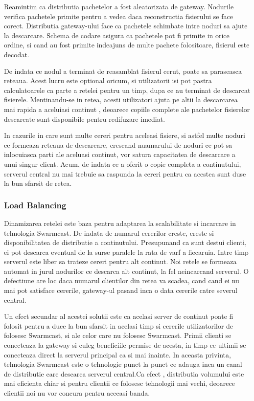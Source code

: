 Reamintim ca distributia pachetelor a fost aleatorizata de gateway. Nodurile
verifica pachetele primite pentru a vedea daca reconstructia fisierului se
face corect. Distributia gateway-ului face ca pachetele schimbate intre noduri
sa ajute la descarcare. Schema de codare asigura ca pachetele pot fi primite
in orice ordine, si cand au fost primite indeajuns de multe pachete
folositoare, fisierul este decodat.

De indata ce nodul a  terminat de reasamblat fisierul cerut, poate sa
paraseasca reteaua. Acest lucru este optional oricum, si utilizatorii isi pot
pastra calculatoarele ca parte a retelei pentru un timp, dupa ce au terminat
de descarcat fisierele. Mentinandu-se in retea, acesti utilizatori ajuta pe
altii la descarcarea mai rapida a  aceluiasi continut , deoarece copiile
complete ale pachetelor fisierelor descarcate sunt disponibile pentru
redifuzare imediat.

In cazurile in care sunt multe cereri pentru aceleasi fisiere, si astfel multe
noduri ce formeaza reteaua de descarcare, crescand nuamarului de noduri ce pot
sa inlocuiasca parti ale aceluasi continut, vor satura capacitatea de
descarcare a unui singur client. Acum, de indata ce a oferit o copie completa
a continutului, serverul central nu mai trebuie sa raspunda la cereri pentru
ca acestea sunt duse la bun sfarsit de retea.

\subsubsection{Load Balancing}

Dinamizarea retelei este baza pentru adaptarea la scalabilitate si incarcare
in tehnologia Swarmcast. De indata de numarul cererilor creste, creste si
disponibilitatea de distributie a continutului. Presupunand ca sunt destui
clienti, ei pot descarca eventual de la surse paralele la rata de varf a
fiecaruia. Intre timp serverul este liber sa trateze cereri pentru alt
continut. Noi retele se formeaza automat in jurul nodurilor ce descarca alt
continut, la fel neincarcand serverul. O defectiune are loc daca numarul
clientilor din retea va scadea, cand cand ei nu mai pot satisface cererile,
gateway-ul pasand inca o data cererile catre severul central.

Un efect secundar al acestei solutii este ca acelasi server de continut poate
fi folosit pentru a duce la bun sfarsit in acelasi timp si cererile
utilizatorilor de folosesc Swarmcast, si ale celor care nu folosesc Swarmcast.
Primii clienti se conecteaza la gateway si culeg beneficiile permise de
acesta, in timp ce ultimii se conecteaza direct la serverul principal ca si
mai inainte. In aceasta privinta, tehnologia Swarmcast este o tehnologie punct
la punct ce adauga inca un canal de distributie care descarca serverul
central.Ca efect , distributia volumului este mai eficienta chiar si pentru
clientii ce folosesc tehnologii mai vechi, deoarece clientii noi nu vor
concura pentru aceeasi banda.


